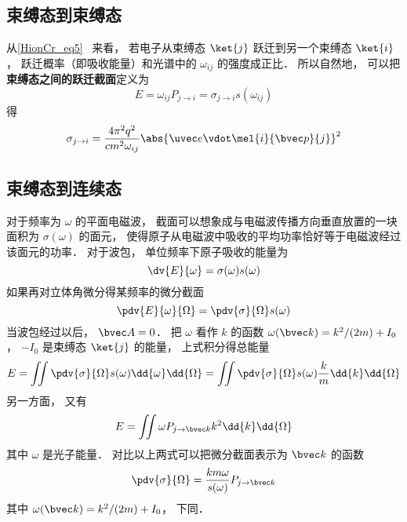 
\begin{issues}
\issueDraft
\end{issues}


\subsection{束缚态到束缚态}
从\autoref{HionCr_eq5}~ 来看， 若电子从束缚态 $\ket{j}$ 跃迁到另一个束缚态 $\ket{i}$， 跃迁概率（即吸收能量）和光谱中的 $\omega_{ij}$ 的强度成正比． 所以自然地， 可以把\textbf{束缚态之间的跃迁截面}定义为
\begin{equation}
E = \omega_{ij}P_{j\to i} = \sigma_{j\to i} s(\omega_{ij})
\end{equation}
得 %
\begin{equation}
\sigma_{j\to i} = \frac{4\pi^2 q^2}{c m^2 \omega_{ij}} \abs{\uvec e \vdot\mel{i}{\bvec p}{j}}^2
\end{equation}

\subsection{束缚态到连续态}
对于频率为 $\omega$ 的平面电磁波， 截面可以想象成与电磁波传播方向垂直放置的一块面积为 $\sigma(\omega)$ 的面元， 使得原子从电磁波中吸收的平均功率恰好等于电磁波经过该面元的功率． 对于波包， 单位频率下原子吸收的能量为
\begin{equation}
\dv{E}{\omega} = \sigma(\omega) s(\omega)
\end{equation}
如果再对立体角微分得某频率的微分截面 %
\begin{equation}
\pdv{E}{\omega}{\Omega} = \pdv{\sigma}{\Omega} s(\omega)
\end{equation}
当波包经过以后， $\bvec A = 0$． 把 $\omega$ 看作 $k$ 的函数 $\omega(\bvec k) = k^2/(2m) + I_0$， $-I_0$ 是束缚态 $\ket{j}$ 的能量， 上式积分得总能量
\begin{equation}
E = \iint \pdv{\sigma}{\Omega} s(\omega) \dd{\omega}\dd{\Omega} = \iint \pdv{\sigma}{\Omega} s(\omega) \frac{k}{m}\dd{k}\dd{\Omega}
\end{equation}
另一方面， 又有
\begin{equation}
E = \iint \omega P_{j\to {\bvec k}} k^2 \dd{k}\dd{\Omega}
\end{equation}
其中 $\omega$ 是光子能量． 对比以上两式可以把微分截面表示为 $\bvec k$ 的函数
\begin{equation}
\pdv{\sigma}{\Omega} = \frac{km \omega}{s(\omega)} P_{j\to \bvec k}
\end{equation}
其中 $\omega(\bvec k) = k^2/(2m) + I_0$， 下同．

